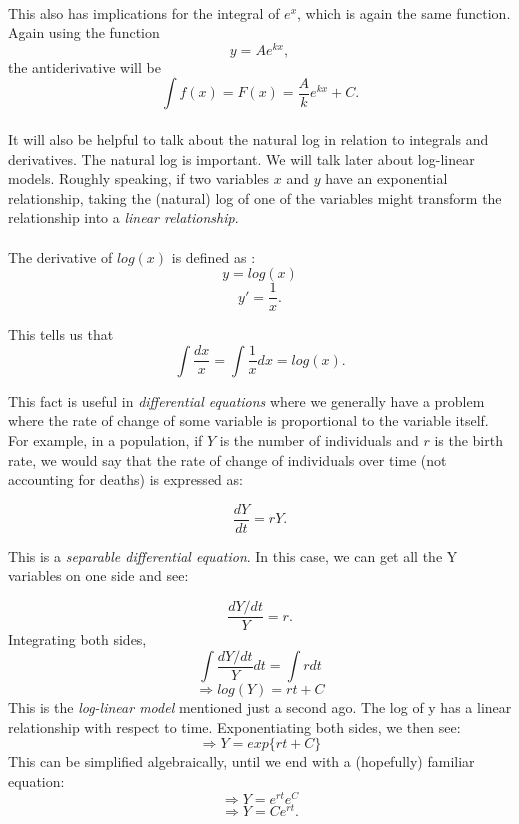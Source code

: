 \documentclass{cup-pan}
\begin{document}
\paragraph{}
This also has implications for the integral of $\textit{e}^x$, which is again the same function. Again using the function $$y =A\textit{e}^{kx},$$ the antiderivative will be $$\int f(x) = F(x) = \frac{A}{k} \textit{e}^{kx} + C.$$

\paragraph{}
It will also be helpful to talk about the natural log in relation to integrals and derivatives. The natural log is important. We will talk later about log-linear models. Roughly speaking, if two variables $x$ and $y$ have an exponential relationship, taking the (natural) log of one of the variables might transform the relationship into a \textit{linear relationship}.

\paragraph{} The derivative of $log(x)$ is defined as :
$$y = log(x)$$ 
$$ y' = \frac{1}{x}.$$

This tells us that 
$$ \int \frac{dx}{x} = \int \frac{1}{x} dx = log(x).$$

This fact is useful in \textit{differential equations} where we generally have a problem where the rate of change of some variable is proportional to the variable itself. For example, in a population, if $Y$ is the number of individuals and $r$ is the birth rate, we would say that the rate of change of individuals over time (not accounting for deaths) is expressed as:

$$ \frac{dY}{dt} = rY.$$

This is a \textit{separable differential equation}. In this case, we can get all the Y variables on one side and see:

$$ \frac{dY/dt}{Y} = r.$$
Integrating both sides,
$$\int \frac{dY/dt}{Y} dt = \int r dt$$
$$ \Rightarrow log(Y) = rt + C$$
This is the \textit{log-linear model} mentioned just a second ago. The log of y has a linear relationship with respect to time. Exponentiating both sides, we then see:
$$ \Rightarrow Y = exp\{rt + C \}$$
This can be simplified algebraically, until we end with a (hopefully) familiar equation:
 $$\Rightarrow Y = \textit{e}^{rt} \textit{e}^C$$
$$ \Rightarrow Y = C \textit{e}^{rt}.$$
\end{document}

